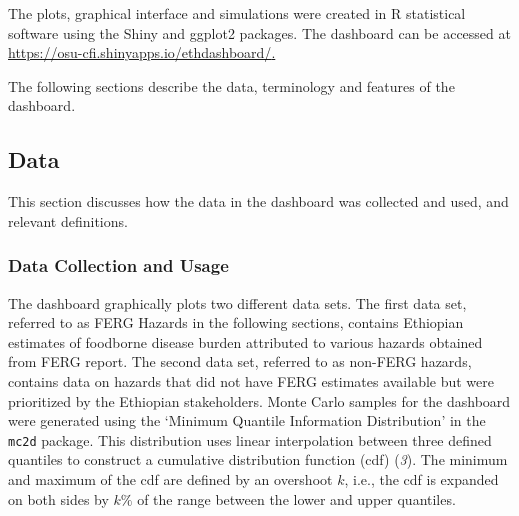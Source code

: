 \documentclass[
  letterpaper,
  DIV=11,
  numbers=noendperiod]{scrartcl}
\begin{document}
The plots, graphical interface and simulations were created in R
statistical software using the Shiny and ggplot2 packages. The dashboard
can be accessed at
\url{https://osu-cfi.shinyapps.io/ethdashboard/}\href{https://osu-cfi.shinyapps.io/ethdashboard/.}{.}

The following sections describe the data, terminology and features of
the dashboard.

\subsection{Data}\label{data}

This section discusses how the data in the dashboard was collected and
used, and relevant definitions.

\subsubsection{Data Collection and
Usage}\label{data-collection-and-usage}

The dashboard graphically plots two different data sets. The first data
set, referred to as FERG Hazards in the following sections, contains
Ethiopian estimates of foodborne disease burden attributed to various
hazards obtained from FERG report. The second data set, referred to as
non-FERG hazards, contains data on hazards that did not have FERG
estimates available but were prioritized by the Ethiopian stakeholders.
Monte Carlo samples for the dashboard were generated using the `Minimum
Quantile Information Distribution' in the \texttt{mc2d} package. This
distribution uses linear interpolation between three defined quantiles
to construct a cumulative distribution function (cdf) (\emph{3}). The
minimum and maximum of the cdf are defined by an overshoot \(k\), i.e.,
the cdf is expanded on both sides by \(k \%\) of the range between the
lower and upper quantiles.
\end{document}
